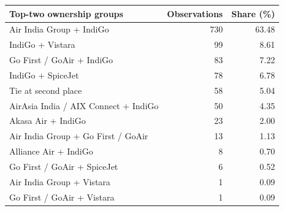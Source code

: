 \begin{tabular}{@{}lrr@{}}
\toprule
Top-two ownership groups & Observations & Share (\%) \\
\midrule
Air India Group + IndiGo & 730 & 63.48 \\
IndiGo + Vistara & 99 & 8.61 \\
Go First / GoAir + IndiGo & 83 & 7.22 \\
IndiGo + SpiceJet & 78 & 6.78 \\
Tie at second place & 58 & 5.04 \\
AirAsia India / AIX Connect + IndiGo & 50 & 4.35 \\
Akasa Air + IndiGo & 23 & 2.00 \\
Air India Group + Go First / GoAir & 13 & 1.13 \\
Alliance Air + IndiGo & 8 & 0.70 \\
Go First / GoAir + SpiceJet & 6 & 0.52 \\
Air India Group + Vistara & 1 & 0.09 \\
Go First / GoAir + Vistara & 1 & 0.09 \\
\bottomrule
\end{tabular}
